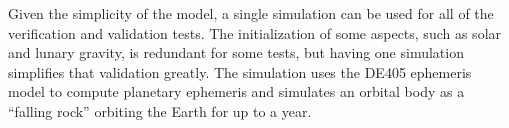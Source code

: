 %
%
% 
%



Given the simplicity of the model, a single simulation can be used for all of the verification and validation tests.  The initialization of some aspects, such as solar and lunary gravity, is redundant for some tests, but having one simulation simplifies that validation greatly.  The simulation uses the DE405 ephemeris model to compute planetary ephemeris and simulates an orbital body as a ``falling rock'' orbiting the Earth for up to a year.

